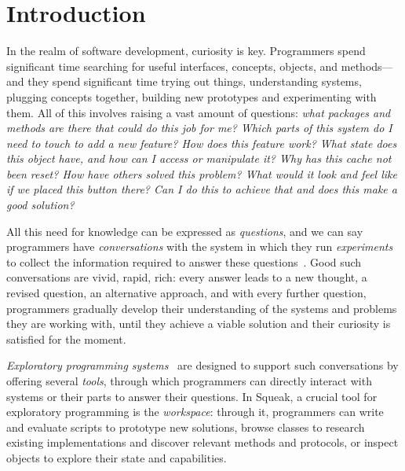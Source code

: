 

\chapter{Introduction}
\label{cha:introduction}

In the realm of software development, curiosity is key.
Programmers spend significant time searching for useful interfaces, concepts, objects, and methods---and they spend significant time trying out things, understanding systems, plugging concepts together, building new prototypes and experimenting with them.
All of this involves raising a vast amount of questions:
\emph{%
	what packages and methods are there that could do this job for me?
	Which parts of this system do I need to touch to add a new feature?
	How does this feature work?
	What state does this object have, and how can I access or manipulate it?
	Why has this cache not been reset?
	How have others solved this problem?
	What would it look and feel like if we placed this button there?
	Can I do this to achieve that and does this make a good solution?
}

All this need for knowledge can be expressed as \emph{questions}, and we can say programmers have \emph{conversations} with the system in which they run \emph{experiments} to collect the information required to answer these questions~\cite{taeumel2022pattern}.
Good such conversations are vivid, rapid, rich: every answer leads to a new thought, a revised question, an alternative approach, and with every further question, programmers gradually develop their understanding of the systems and problems they are working with, until they achieve a viable solution and their curiosity is satisfied for the moment.

\emph{Exploratory programming systems}~\cite{sandberg1988smalltalk,rein2018exploratory} are designed to support such conversations by offering several \emph{tools}, through which programmers can directly interact with systems or their parts to answer their questions.
In Squeak, a crucial tool for exploratory programming is the \emph{workspace}:
through it, programmers can write and evaluate scripts to prototype new solutions, browse classes to research existing implementations and discover relevant methods and protocols, or inspect objects to explore their state and capabilities.

